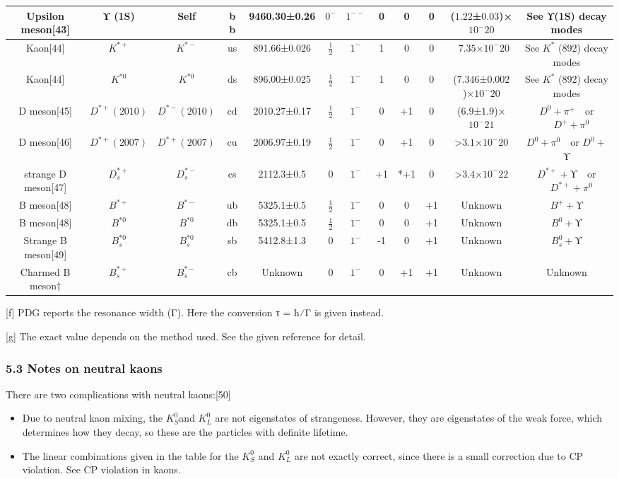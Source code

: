 \begin{table}[ht]
\begin{tabular}{|c|c|c|c|c|c|c|c|c|c|c|c|}
Upsilon meson[43] &ϒ (1S)	 & Self & b b &   9460.30±0.26& $0^-$ & $1^{--}$ &0 & 0 &0& ($1.22$±$0.03$)×$10^-20$ &See ϒ(1S) decay modes\\
\hline
Kaon[44] & $K^{*+}$ & $K^{*-}$  & us &   891.66±0.026 & $\frac{1}{2}$ & $1^-$ & 1 & 0 & 0 & ~$7.35$×$10^-20$ &See $K^*$ (892) decay modes\\
\hline
Kaon[44] & $K^{*0}$ & $K^{*0}$ & ds &  896.00±0.025 & $\frac{1}{2}$ & $1^-$  & 1 & 0 & 0 & ($7.346$±$0.002$)×$10^-20$ & See $K^*$ (892) decay modes\\
\hline
D meson[45] & $D^{*+}(2010)$ & $D^{*-}(2010)$ &cd &	2010.27±0.17   & $\frac{1}{2}$ & $1^-$& 0 & +1 & 0 & ($6.9$±$1.9$)×$10^-21$ & $D^0+\pi^+ \quad$or $\quad D^+ +\pi^0$ \\
\hline
D meson[46] & $D^{*+}(2007)$ & $D^{*+}(2007)$ & cu & 2006.97±0.19& $\frac{1}{2}$ &  $1^-$ & 0 & +1 & 0& >$3.1$×$10^-20$ & $D^0+\pi^0 \quad$or $D^0+$ϒ \\
\hline
strange D meson[47]	 & $D^{*+}_s$ & $D^{*-}_s$ & cs & 2112.3±0.5 & 0& $1^-$ & +1 & *+1& 0 & >$3.4$×$10^-22$& $D^{*+}+\text{ϒ} \quad$or $\quad D^{*+}+\pi^0$ \\
\hline
B meson[48] &$B^{*+}$ & $B^{*-}$ &ub &5325.1±0.5 & $\frac{1}{2}$ & $1^-$& 0 & 0 & +1 & Unknown &$B^+ +$ϒ \\
\hline
B meson[48] &$B^{*0}$ & $B^{*0}$ & db &5325.1±0.5 & $ \frac{1}{2}$&$1^-$ & 0 & 0 & +1 & Unknown & $B^0 +$ϒ\\
\hline
Strange B meson[49] & $B^{*0}_s$ & $B^{*0}_s$ & sb&5412.8±1.3 &0 & $1^-$ & -1 & 0 & +1 & Unknown& $B^0_s+$ϒ \\
\hline
Charmed B meson† & $B^{*+}_s$  & $B^{*-}_s$ & cb & Unknown& 0 & $1^-$ & 0 & +1 & +1 & Unknown & Unknown \\
\hline
\end{tabular}
\end{table}
[f] PDG reports the resonance width (Γ). Here the conversion τ = ħ⁄Γ is given instead.

[g] The exact value depends on the method used. See the given reference for detail.
\subsubsection{5.3 Notes on neutral kaons}
There are two complications with neutral kaons:[50]
\begin{itemize}
\item Due to neutral kaon mixing, the $K^0_S $and $K^0_L $ are not eigenstates of strangeness. However, they are eigenstates of the weak force, which determines how they decay, so these are the particles with definite lifetime.
\item The linear combinations given in the table for the $K^0_S $ and $K^0_L $ are not exactly correct, since there is a small correction due to CP violation. See CP violation in kaons.
\end{itemize}




